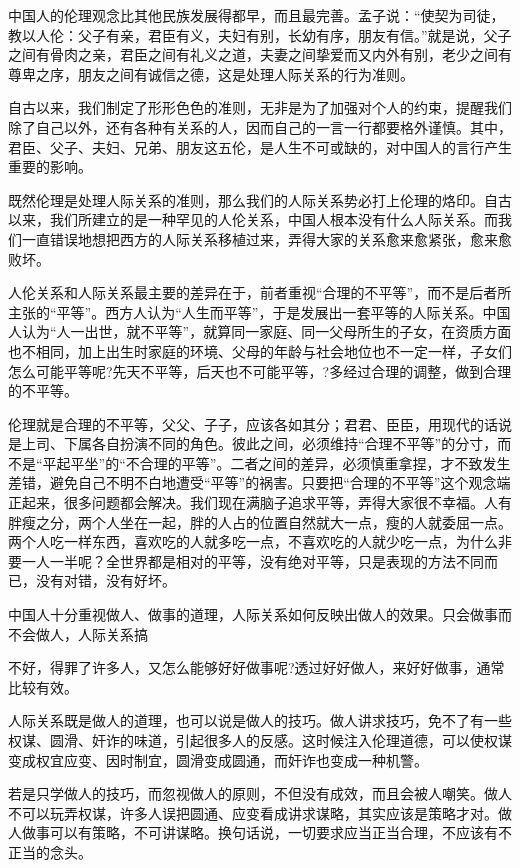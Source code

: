 \documentclass[fontset=fandol, a4paper, 12pt, openright]{ctexbook}
\begin{document}
中国人的伦理观念比其他民族发展得都早，而且最完善。孟子说：“使契为司徒，教以人伦：父子有亲，君臣有义，夫妇有别，长幼有序，朋友有信。”就是说，父子之间有骨肉之亲，君臣之间有礼义之道，夫妻之间挚爱而又内外有别，老少之间有尊卑之序，朋友之间有诚信之德，这是处理人际关系的行为准则。

自古以来，我们制定了形形色色的准则，无非是为了加强对个人的约束，提醒我们除了自己以外，还有各种有关系的人，因而自己的一言一行都要格外谨慎。其中，君臣、父子、夫妇、兄弟、朋友这五伦，是人生不可或缺的，对中国人的言行产生重要的影响。

既然伦理是处理人际关系的准则，那么我们的人际关系势必打上伦理的烙印。自古以来，我们所建立的是一种罕见的人伦关系，中国人根本没有什么人际关系。而我们一直错误地想把西方的人际关系移植过来，弄得大家的关系愈来愈紧张，愈来愈败坏。

人伦关系和人际关系最主要的差异在于，前者重视“合理的不平等”，而不是后者所主张的“平等”。西方人认为“人生而平等”，于是发展出一套平等的人际关系。中国人认为“人一出世，就不平等”，就算同一家庭、同一父母所生的子女，在资质方面也不相同，加上出生时家庭的环境、父母的年龄与社会地位也不一定一样，子女们怎么可能平等呢?先天不平等，后天也不可能平等，?多经过合理的调整，做到合理的不平等。

伦理就是合理的不平等，父父、子子，应该各如其分；君君、臣臣，用现代的话说是上司、下属各自扮演不同的角色。彼此之间，必须维持“合理不平等”的分寸，而不是“平起平坐”的“不合理的平等”。二者之间的差异，必须慎重拿捏，才不致发生差错，避免自己不明不白地遭受“平等”的祸害。只要把“合理的不平等”这个观念端正起来，很多问题都会解决。我们现在满脑子追求平等，弄得大家很不幸福。人有胖瘦之分，两个人坐在一起，胖的人占的位置自然就大一点，瘦的人就委屈一点。两个人吃一样东西，喜欢吃的人就多吃一点，不喜欢吃的人就少吃一点，为什么非要一人一半呢？全世界都是相对的平等，没有绝对平等，只是表现的方法不同而已，没有对错，没有好坏。

中国人十分重视做人、做事的道理，人际关系如何反映出做人的效果。只会做事而不会做人，人际关系搞

不好，得罪了许多人，又怎么能够好好做事呢?透过好好做人，来好好做事，通常比较有效。

人际关系既是做人的道理，也可以说是做人的技巧。做人讲求技巧，免不了有一些权谋、圆滑、奸诈的味道，引起很多人的反感。这时候注入伦理道德，可以使权谋变成权宜应变、因时制宜，圆滑变成圆通，而奸诈也变成一种机警。

若是只学做人的技巧，而忽视做人的原则，不但没有成效，而且会被人嘲笑。做人不可以玩弄权谋，许多人误把圆通、应变看成讲求谋略，其实应该是策略才对。做人做事可以有策略，不可讲谋略。换句话说，一切要求应当正当合理，不应该有不正当的念头。
\end{document}
